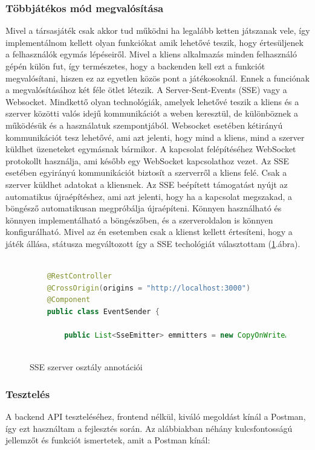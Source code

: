 \documentclass[a4paper,twoside]{article}
\begin{document}
\subsubsection{Többjátékos mód megvalósítása}
Mivel a társasjáték csak akkor tud működni ha legalább ketten játszanak vele, így implementálnom kellett olyan funkciókat amik lehetővé teszik, hogy értesüljenek 
a felhasználók egymás lépéseiről. Mivel a kliens alkalmazás minden felhasználó gépén külön fut, így természetes, hogy a backenden kell ezt a funkciót megvalósítani, hiszen ez az egyetlen közös pont a játékosoknál. Ennek a funciónak a megvalósításához két féle ötlet létezik. A Server-Sent-Events (SSE) vagy a Websocket. Mindkettő olyan technológiák, amelyek lehetővé teszik a kliens és a szerver közötti valós idejű kommunikációt a weben keresztül, de különböznek a működésük és a használatuk szempontjából. Websocket esetében kétirányú kommunikációt tesz lehetővé, ami azt jelenti, hogy mind a kliens, mind a szerver küldhet üzeneteket egymásnak bármikor. A kapcsolat felépítéséhez WebSocket protokollt használja, ami később egy WebSocket kapcsolathoz vezet. Az SSE esetében egyirányú kommunikációt biztosít a szerverről a kliens felé. Csak a szerver küldhet adatokat a kliensnek. Az SSE beépített támogatást nyújt az automatikus újraépítéshez, ami azt jelenti, hogy ha a kapcsolat megszakad, a böngésző automatikusan megpróbálja újraépíteni. Könnyen használható és könnyen implementálható a böngészőben, és a szerveroldalon is könnyen konfigurálható. Mivel az én esetemben csak a klienst kellett értesíteni, hogy a játék állása, státusza megváltozott így a SSE techológiát választottam (\ref{sse}.ábra). 
\begin{figure}[h]
	\caption{SSE szerver osztály annotációi}
	\centering
	\begin{lstlisting}[language=java]
		
	@RestController
	@CrossOrigin(origins = "http://localhost:3000")
	@Component
	public class EventSender {
		
		public List<SseEmitter> emmitters = new CopyOnWriteArrayList<SseEmitter>();
		
	\end{lstlisting}
	\label{sse}
\end{figure} 
\subsubsection{Tesztelés}
A backend API teszteléséhez, frontend nélkül, kiváló megoldást kínál a Postman\cite{postman}, így ezt használtam a fejlesztés során. Az alábbiakban néhány kulcsfontosságú jellemzőt és funkciót ismertetek, amit a Postman kínál:
\end{document}
